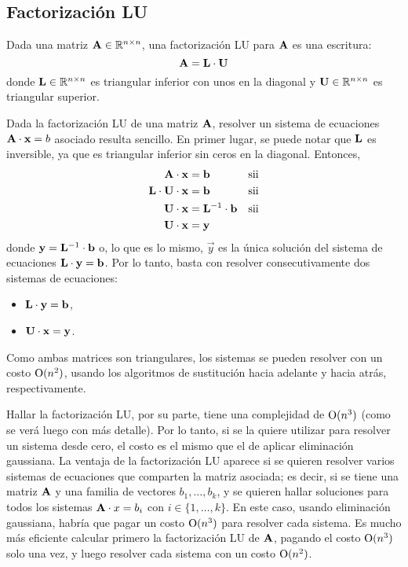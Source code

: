 \subsection{Factorización LU}

Dada una matriz $\mathbf{A} \in \mathbb{R}^{n \times n}$, una factorización LU para
$\mathbf{A}$ es una escritura:
\[ \mathbf{A} = \mathbf{L} \cdot \mathbf{U} \]
donde $\mathbf{L} \in \mathbb{R}^{n \times n}$ es triangular inferior con unos en
la diagonal y $\mathbf{U} \in \mathbb{R}^{n \times n}$ es triangular superior.

Dada la factorización LU de una matriz $\mathbf{A}$, resolver un sistema de
ecuaciones $\mathbf{A} \cdot \mathbf{x} = b$ asociado resulta sencillo. En primer
lugar, se puede notar que $\mathbf{L}$ es inversible, ya que es triangular
inferior sin ceros en la diagonal. Entonces,
\[ \begin{aligned}
    \mathbf{A} \cdot \mathbf{x} &= \mathbf{b} &\text{sii} \\
    \mathbf{L} \cdot \mathbf{U} \cdot \mathbf{x} &= \mathbf{b} &\text{sii} \\
    \mathbf{U} \cdot \mathbf{x} &= \mathbf{L}^{-1} \cdot \mathbf{b} &\text{sii} \\
    \mathbf{U} \cdot \mathbf{x} &= \mathbf{y} \\
\end{aligned} \]
donde $\mathbf{y} = \mathbf{L}^{-1} \cdot \mathbf{b}$ o, lo que es lo mismo, $\vec{y}$
es la única solución del sistema de ecuaciones $\mathbf{L} \cdot \mathbf{y} =
\mathbf{b}$. Por lo tanto, basta con resolver consecutivamente dos sistemas de
ecuaciones:
\begin{itemize}
\item $\mathbf{L} \cdot \mathbf{y} = \mathbf{b}$,
\item $\mathbf{U} \cdot \mathbf{x} = \mathbf{y}$.
\end{itemize}
Como ambas matrices son triangulares, los sistemas se pueden resolver con
un costo $\mathrm{O}(n^2)$, usando los algoritmos de sustitución hacia adelante y
hacia atrás, respectivamente.

Hallar la factorización LU, por su parte, tiene una complejidad de
$\mathrm{O}(n^3)$ (como se verá luego con más detalle).
Por lo tanto, si se la quiere utilizar para resolver un sistema
desde cero, el costo es el mismo que el de aplicar eliminación gaussiana.
La ventaja de la factorización LU aparece si se quieren resolver varios
sistemas de ecuaciones que comparten la matriz asociada; es decir, si se
tiene una matriz $\mathbf{A}$ y una familia de vectores $b_1, \dots, b_k$, y se
quieren hallar soluciones para todos los sistemas $\mathbf{A} \cdot x = b_i$ con
$i \in \{1, \dots, k\}$.
En este caso, usando eliminación gaussiana, habría que pagar un costo
$\mathrm{O}(n^3)$ para resolver cada sistema. Es mucho más eficiente calcular
primero la factorización LU de $\mathbf{A}$, pagando el costo $\mathrm{O}(n^3)$
solo una vez, y luego resolver cada sistema con un costo $\mathrm{O}(n^2)$.

